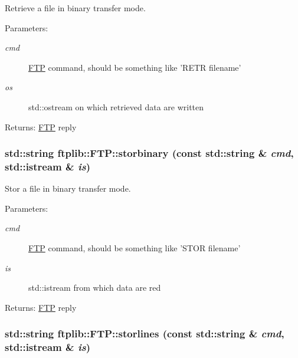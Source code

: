 Retrieve a file in binary transfer mode. 

\begin{Desc}
\item[Parameters:]
\begin{description}
\item[{\em cmd}]\hyperlink{classftplib_1_1FTP}{FTP} command, should be something like 'RETR filename' \item[{\em os}]std::ostream on which retrieved data are written \end{description}
\end{Desc}
\begin{Desc}
\item[Returns:]\hyperlink{classftplib_1_1FTP}{FTP} reply \end{Desc}
\hypertarget{classftplib_1_1FTP_37c828c7d98c7da3fe3b936526118416}{
\subsubsection{\setlength{\rightskip}{0pt plus 5cm}std::string ftplib::FTP::storbinary (const std::string \& {\em cmd}, \/  std::istream \& {\em is})}}
\label{classftplib_1_1FTP_37c828c7d98c7da3fe3b936526118416}


Stor a file in binary transfer mode. 

\begin{Desc}
\item[Parameters:]
\begin{description}
\item[{\em cmd}]\hyperlink{classftplib_1_1FTP}{FTP} command, should be something like 'STOR filename' \item[{\em is}]std::istream from which data are red \end{description}
\end{Desc}
\begin{Desc}
\item[Returns:]\hyperlink{classftplib_1_1FTP}{FTP} reply \end{Desc}
\hypertarget{classftplib_1_1FTP_956c5fa0546d7a6a2db0b4dee28f6868}{
\subsubsection{\setlength{\rightskip}{0pt plus 5cm}std::string ftplib::FTP::storlines (const std::string \& {\em cmd}, \/  std::istream \& {\em is})}}
\label{classftplib_1_1FTP_956c5fa0546d7a6a2db0b4dee28f6868}


